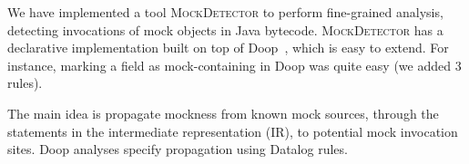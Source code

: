 \label{sec:mocks}

We have implemented a tool \textsc{MockDetector} to perform fine-grained analysis, detecting invocations of mock objects in Java bytecode. \textsc{MockDetector} has a declarative implementation built on top of Doop~\cite{bravenboer09:_stric_declar_specif_sophis_point_analy}, which is easy to extend. For instance, marking a field as mock-containing in Doop was quite easy (we added 3 rules).

The main idea is propagate mockness from known mock sources, through the statements in the intermediate representation (IR), to potential mock invocation sites. Doop analyses specify propagation using Datalog rules. 


